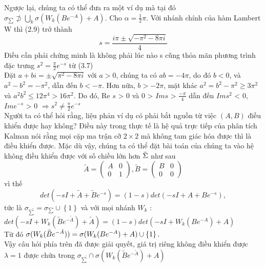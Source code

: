  Ngược lại, chúng ta có thể đưa ra một ví dụ mà tại đó $\sigma_{\sum} \not\supset \displaystyle \bigcup_{k}\sigma(W_{k}(Be^{-A})+A)$. Cho $\alpha = \frac{1}{2}\pi$. Với nhánh chính của hàm Lambert W thì (2.9) trở thành
 $$s = \frac{i\pi \pm \sqrt{-\pi^{2}-8\pi i}}{4}$$
 Điều cần phải chứng minh là không phải lúc nào s cũng thỏa mãn phương trình đặc trưng $s^{2} = \frac{\pi}{2}e^{-s}$ từ (3.7) \\
 Đặt $a +bi = \pm \sqrt{\pi^{2}-8\pi i}$ với $a > 0$, chúng ta có $ab = -4\pi$, do đó $b < 0$, và $a^{2} - b^{2} = -\pi^{2}$, dẫn đến $b < -\pi$. Hơn nữa, $b > -2\pi$, mặt khác $a^{2} = b^{2} - \pi^{2} \ge 3\pi^{2}$ và $a^{2}b^{2} \le 12\pi^{4} > 16\pi^{2}$. Do đó, Re $s$ > 0 và 0 > $Im s$ > $\frac{-\pi}{4}$ dẫn đến $Im s^{2}$ < 0, $Im e^{-s}$ > 0 $\Rightarrow s^{2} \neq \frac{\pi}{2}e^{-s}$ \\
 Người ta có thể hỏi rằng, liệu phản ví dụ có phải bắt nguồn từ việc $(A,B)$ điều khiển được hay không? Điều này trong thực tế là hệ quả trực tiếp của phân tích Kalman nói rằng mọi cặp ma trận cỡ $2 \times 2$ mà không tam giác hóa được thì là điều khiển được. Mặc dù vậy, chúng ta có thể đặt bài toán của chúng ta vào hệ không điều khiển được với số chiều lớn hơn $\tilde{\Sigma}$ như sau
 $$ \tilde{A} = \begin{pmatrix}
 A & 0\\
 0 & 1
 \end{pmatrix} , \tilde{B} = \begin{pmatrix}
 B & 0\\
 0 & 0
 \end{pmatrix} $$
 vì thế 
 $$ det(-sI + \tilde{A} + \tilde{B}e^{-s}) = (1-s)det(-sI + A + Be^{-s}),$$ tức là $\sigma_{\tilde{\sum}} = \sigma_{\sum} \cup \left\{1\right\}$ và với mọi nhánh $W_{k}$ : \\
 $det(-sI + W_{k}(\tilde{B}e^{-\tilde{A}})+\tilde{A})
 = (1-s)det(-sI + W_{k}(Be^{-A})+A)$ \\
 Từ đó 
 $\sigma(W_{k}(\tilde{B}e^{-\Bar{A}})) = \sigma(W_{k}(Be^{-A})+A) \cup \left\{1\right\}.$ \\
 Vậy câu hỏi phía trên đã được giải quyết, giá trị riêng không điều khiển được $\lambda = 1$ được chứa trong $\sigma_{\tilde{\sum}} \cap \sigma(W_{k}(\tilde{B}e^{-\tilde{A}})+A)$ \\
